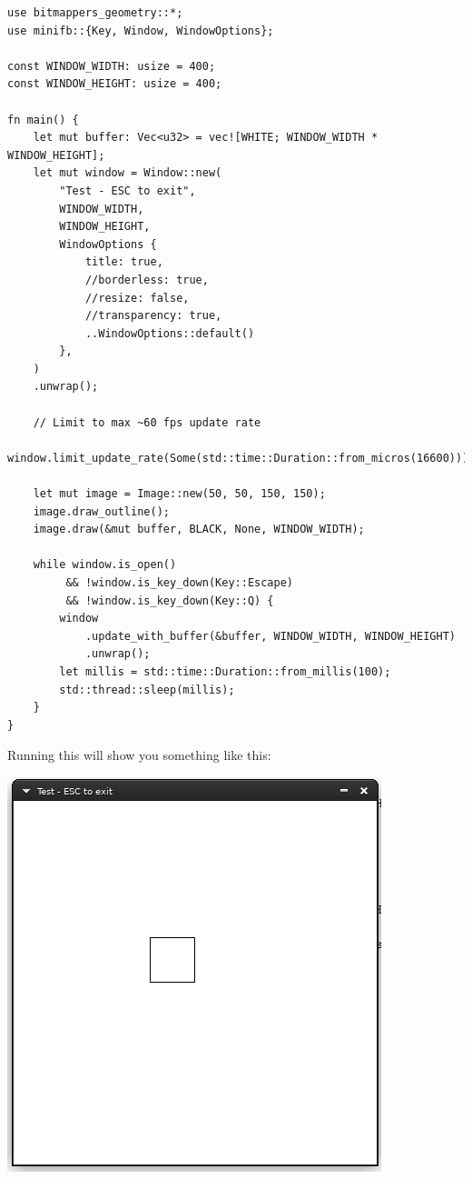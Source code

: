 \documentclass[12pt,a4,oneside,usenames,dvipsnames]{book}
\begin{document}
\begin{verbatim}
use bitmappers_geometry::*;
use minifb::{Key, Window, WindowOptions};

const WINDOW_WIDTH: usize = 400;
const WINDOW_HEIGHT: usize = 400;

fn main() {
    let mut buffer: Vec<u32> = vec![WHITE; WINDOW_WIDTH * WINDOW_HEIGHT];
    let mut window = Window::new(
        "Test - ESC to exit",
        WINDOW_WIDTH,
        WINDOW_HEIGHT,
        WindowOptions {
            title: true,
            //borderless: true,
            //resize: false,
            //transparency: true,
            ..WindowOptions::default()
        },
    )
    .unwrap();

    // Limit to max ~60 fps update rate
    window.limit_update_rate(Some(std::time::Duration::from_micros(16600)));

    let mut image = Image::new(50, 50, 150, 150);
    image.draw_outline();
    image.draw(&mut buffer, BLACK, None, WINDOW_WIDTH);

    while window.is_open()
         && !window.is_key_down(Key::Escape)
         && !window.is_key_down(Key::Q) {
        window
            .update_with_buffer(&buffer, WINDOW_WIDTH, WINDOW_HEIGHT)
            .unwrap();
        let millis = std::time::Duration::from_millis(100);
        std::thread::sleep(millis);
    }
}
\end{verbatim}

Running this will show you something like this:

\includegraphics{figures/introduction.png}
\end{document}

